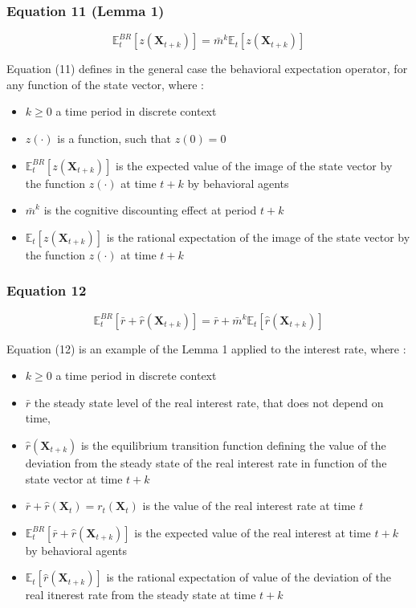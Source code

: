 \documentclass{article}
\begin{document}
\subsubsection*{Equation 11 (Lemma 1)}

\begin{equation}
    \mathbb{E}_{t}^{BR}\left[z\left(\bm{X}_{t+k}\right)\right]=\bar{m}^{k}\mathbb{E}_{t}\left[z\left(\bm{X}_{t+k}\right)\right]
\end{equation}

Equation (11) defines in the general case the behavioral expectation operator, for any function of the state vector, where : 
\begin{itemize}
    \item $k\geq 0$ a time period in discrete context
    \item $z(\cdot)$ is a function, such that $z(0)=0$
    \item $\mathbb{E}_{t}^{BR}\left[z\left(\bm{X}_{t+k}\right)\right]$ is the expected value of the image of the state vector by the function $z(\cdot)$ at time $t+k$ by behavioral agents
    \item $\bar{m}^{k}$ is the cognitive discounting effect at period $t+k$
    \item $\mathbb{E}_{t}\left[z\left(\bm{X}_{t+k}\right)\right]$ is the rational expectation of the image of the state vector by the function $z(\cdot)$ at time $t+k$
\end{itemize}

\subsubsection*{Equation 12}

\begin{equation}
    \mathbb{E}_{t}^{BR}\left[\bar{r}+\hat{r}\left(\bm{X}_{t+k}\right)\right]=\bar{r}+\bar{m}^{k}\mathbb{E}_{t}\left[\hat{r}(\bm{X}_{t+k})\right]
\end{equation}

Equation (12) is an example of the Lemma 1 applied to the interest rate, where :
\begin{itemize}
    \item $k\geq 0$ a time period in discrete context
    \item $\bar{r}$ the steady state level of the real interest rate, that does not depend on time,  
    \item $\hat{r}(\bm{X}_{t+k})$ is the equilibrium transition function defining the value of the deviation from the steady state of the real interest rate in function of the state vector at time $t+k$
    \item $\bar{r}+\hat{r}(\bm{X}_{t})=r_{t}(\bm{X}_{t})$ is the value of the real interest rate at time $t$
    \item $\mathbb{E}_{t}^{BR}\left[\bar{r}+\hat{r}(\bm{X}_{t+k})\right]$ is the expected value of the real interest at time $t+k$ by behavioral agents
    \item $\mathbb{E}_{t}\left[\hat{r}(\bm{X}_{t+k})\right]$ is the rational expectation of value of the deviation of the real itnerest rate from the steady state at time $t+k$
\end{itemize}
\end{document}
